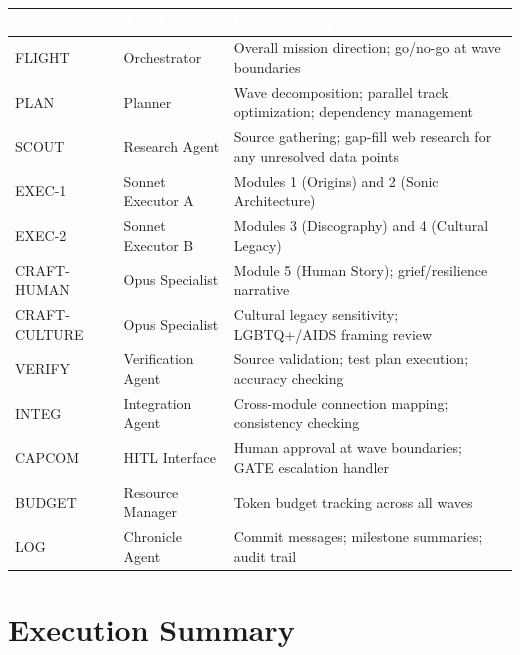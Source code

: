 \documentclass[11pt,letterpaper]{article}
\newcommand{\tableheader}[1]{\textbf{\sffamily\textcolor{white}{#1}}}
\begin{document}
\begin{center}
\begin{tabularx}{\textwidth}{L{2cm}L{3cm}X}
\toprule
{}
\tableheader{Role} & \tableheader{Agent} & \tableheader{Responsibility} \\
\midrule
FLIGHT & Orchestrator & Overall mission direction; go/no-go at wave boundaries \\
PLAN & Planner & Wave decomposition; parallel track optimization; dependency management \\
SCOUT & Research Agent & Source gathering; gap-fill web research for any unresolved data points \\
EXEC-1 & Sonnet Executor A & Modules 1 (Origins) and 2 (Sonic Architecture) \\
EXEC-2 & Sonnet Executor B & Modules 3 (Discography) and 4 (Cultural Legacy) \\
CRAFT-HUMAN & Opus Specialist & Module 5 (Human Story); grief/resilience narrative \\
CRAFT-CULTURE & Opus Specialist & Cultural legacy sensitivity; LGBTQ+/AIDS framing review \\
VERIFY & Verification Agent & Source validation; test plan execution; accuracy checking \\
INTEG & Integration Agent & Cross-module connection mapping; consistency checking \\
CAPCOM & HITL Interface & Human approval at wave boundaries; GATE escalation handler \\
BUDGET & Resource Manager & Token budget tracking across all waves \\
LOG & Chronicle Agent & Commit messages; milestone summaries; audit trail \\
\bottomrule
\end{tabularx}
\end{center}

\section{Execution Summary}
\end{document}
